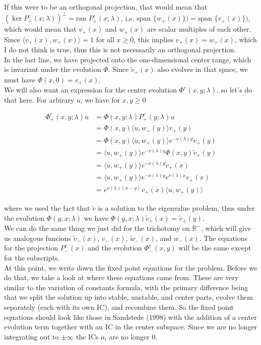 \documentclass[12pt]{article}
\def\R{{\mathbb R}}
\begin{document}
If this were to be an orthogonal projection, that would mean that $(\ker P^c_+(x; \lambda))^
\perp = \text{ran } P^c_+(x; \lambda)$, i.e. $\text{span }\{ w_+(x) \}) = \text{span }\{ v_+(x) \})$, which would mean that $v_+(x)$ and $w_+(x)$ are scalar multiples of each other. Since $\langle v_+(x), w_+(x) \rangle = 1$ for all $x \geq 0$, this implies $v_+(x) = w_+(x)$, which I do not think is true, thus this is not necessarily an orthogonal projection.\\

In the last line, we have projected onto the one-dimensional center range, which is invariant under the evolution $\Phi$. Since $\tilde{v}_+(x)$ also evolves in that space, we must have $\Phi(x,0) = v_+(x)$.\\

We will also want an expression for the center evolution $\Phi^c(x,y; \lambda)$, so let's do that here. For arbirary $u$, we have for $x, y \geq 0$

\begin{align*}
\Phi^c_+(x,y; \lambda)u &= \Phi(x,y; \lambda) P^c_+(y; \lambda) u \\
&= \Phi(x,y) \langle u, w_+(y) \rangle v_+(y) \\
&= \Phi(x,y) \langle u, w_+(y) \rangle e^{-\nu(\lambda)y} \tilde{v}_+(y) \\
&= \langle u, w_+(y) \rangle e^{-\nu(\lambda)y} \Phi(x,y) \tilde{v}_+(y) \\
&= \langle u, w_+(y) \rangle e^{-\nu(\lambda)y} \tilde{v}_+(x) \\
&= \langle u, w_+(y) \rangle e^{-\nu(\lambda)y} e^{\nu(\lambda)x} v_+(x) \\
&= e^{\nu(\lambda)(x-y)} v_+(x) \langle u, w_+(y) \rangle 
\end{align*}

where we used the fact that $\tilde{v}$ is a solution to the eigenvalue problem, thus under the evolution $\Phi(y, x; \lambda)$ we have $\Phi(y, x; \lambda)\tilde{v}_+(x) = \tilde{v}_+(y)$.\\

We can do the same thing we just did for the trichotomy on $\R^-$, which will give us analogous funcions $\tilde{v}_-(x)$, $v_-(x)$, $\tilde{w}_-(x)$, and $w_-(x)$. The equations for the projection $P^c_-(x)$ and the evolution $\Phi^c_-(x,y)$ will be the same except for the subscripts.\\

At this point, we write down the fixed point equations for the problem. Before we do that, we take a look at where these equations came from. These are very similar to the variation of constants formula, with the primary difference being that we split the solution up into stable, unstable, and center parts, evolve them separately (each with its own IC), and recombine them. So the fixed point equations should look like those in Sandstede (1998) with the addition of a center evolution term together with an IC in the center subspace. Since we are no longer integrating out to $\pm \infty$ the ICs $a_i$ are no longer 0.\\
\end{document}
